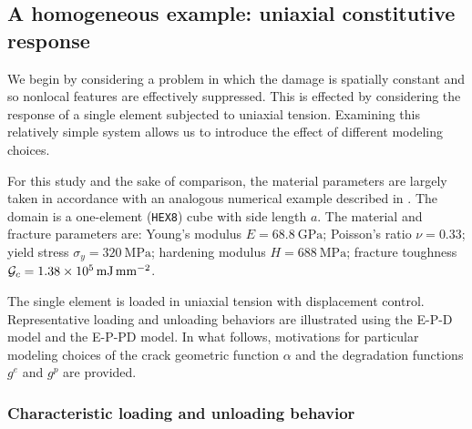 \subsection{A homogeneous example: uniaxial constitutive response}
\label{section: Chapter5/verification/homogenized}

We begin by considering a problem in which the damage is spatially constant and so nonlocal features are effectively suppressed.  This is effected by considering the response of a single element subjected to uniaxial tension.  Examining this relatively simple system allows us to introduce the effect of different modeling choices.

For this study and the sake of comparison, the material parameters are largely taken in accordance with an analogous numerical example described in \citet{borden2016phase}. The domain is a one-element (\texttt{HEX8}) cube with side length $a$. The material and fracture parameters are: Young's modulus $E = \SI{68.8}{\giga\pascal}$;  Poisson's ratio $\nu = 0.33$; yield stress $\sigma_y = \SI{320}{\mega\pascal}$; hardening modulus $H = \SI{688}{\mega\pascal}$; fracture toughness ${\mathcal{G}_c} = \SI{1.38e5}{\milli\joule\per\square\milli\meter}$.

The single element is loaded in uniaxial tension with displacement control. Representative loading and unloading behaviors are illustrated using the E-P-D model and the E-P-PD model. In what follows,  motivations for  particular modeling choices of the crack geometric function $\alpha$ and the degradation functions $g^e$ and $g^p$ are provided.

\subsubsection{Characteristic loading and unloading behavior}
\label{section: Chapter5/verification/homogenized/characteristics}

